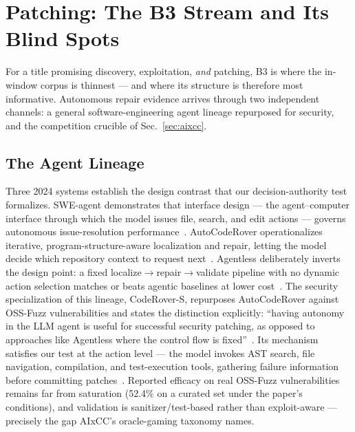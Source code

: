 \section{Patching: The B3 Stream and Its Blind Spots}
\label{sec:patching}

For a title promising discovery, exploitation, \emph{and} patching, B3 is where the in-window
corpus is thinnest --- and where its structure is therefore most informative. Autonomous repair
evidence arrives through two independent channels: a general software-engineering agent lineage
repurposed for security, and the competition crucible of Sec.~\ref{sec:aixcc}.

\subsection{The Agent Lineage}
Three 2024 systems establish the design contrast that our decision-authority test formalizes.
SWE-agent demonstrates that interface design --- the agent--computer interface through which the
model issues file, search, and edit actions --- governs autonomous issue-resolution
performance~\cite{sweagent2024}. AutoCodeRover operationalizes iterative,
program-structure-aware localization and repair, letting the model decide which repository
context to request next~\cite{autocoderoever2024}. Agentless deliberately inverts the design
point: a fixed localize$\rightarrow$repair$\rightarrow$validate pipeline with no dynamic action
selection matches or beats agentic baselines at lower cost~\cite{agentless2024}. The security
specialization of this lineage, CodeRover-S, repurposes AutoCodeRover against OSS-Fuzz
vulnerabilities and states the distinction explicitly: ``having autonomy in the LLM agent is
useful for successful security patching, as opposed to approaches like Agentless where the
control flow is fixed''~\cite{ossfuzzfix2024}. Its mechanism satisfies our test at the action
level --- the model invokes AST search, file navigation, compilation, and test-execution tools,
gathering failure information before committing patches~\cite{ossfuzzfix2024}. Reported efficacy
on real OSS-Fuzz vulnerabilities remains far from saturation (52.4\% on a curated set under the
paper's conditions), and validation is sanitizer/test-based rather than exploit-aware ---
precisely the gap AIxCC's oracle-gaming taxonomy names.

